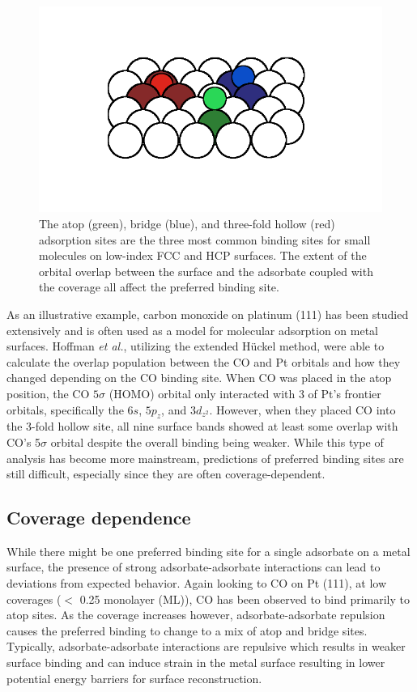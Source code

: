 \begin{figure}[p!]
  \centering
  \includegraphics[width=\linewidth]{../figures/chap1/binding.pdf}
  \caption{The atop (green), bridge (blue), and three-fold hollow (red)
adsorption sites are the three most common binding sites for small molecules on
low-index FCC and HCP surfaces. The extent of the orbital overlap between the surface and the adsorbate coupled with the coverage all affect the preferred binding site.}
\label{fig:binding}
\end{figure}

As an illustrative example, carbon monoxide on platinum (111) has been studied
extensively\citep{Ertl:1977cg, Kelemen:1979ad, Yeo:1997th, Wong:1991ta,
Feibelman:2001qa, Deshlahra:2009wu, Deshlahra:2012aa} and is often used as a
model for molecular adsorption on metal surfaces.  Hoffman {\em et al.},
utilizing the extended H\"uckel method,\citep{Wong:1991ta} were able to
calculate the overlap population between the CO and Pt orbitals and how they
changed depending on the CO  binding site.  When CO was placed in the atop
position, the CO $5\sigma$ (HOMO) orbital only interacted with 3 of Pt's
frontier orbitals, specifically the $6s$, $5p_z$, and $3d_{z^2}$. However, when
they placed CO into the 3-fold hollow site, all nine surface bands showed at
least some overlap with CO's 5$\sigma$ orbital despite the overall binding
being weaker. While this type of analysis has become more mainstream,
predictions of preferred binding sites are still difficult, especially since
they are often coverage-dependent.

\subsection{Coverage dependence}
While there might be one preferred binding site for a single adsorbate on a
metal surface, the presence of strong adsorbate-adsorbate interactions can lead
to deviations from expected behavior. Again looking to CO on Pt (111), at low
coverages ($<$ 0.25 monolayer (ML)), CO has been observed to bind primarily to
atop sites.\citep{Kelemen:1979ad, Feibelman:2001qa} As the coverage increases
however, adsorbate-adsorbate repulsion causes the preferred binding to change
to a mix of atop and bridge sites.\citep{Deshlahra:2012aa} Typically,
adsorbate-adsorbate interactions are repulsive which results in weaker surface
binding and can induce strain in the metal surface resulting in lower potential
energy barriers for surface reconstruction.


